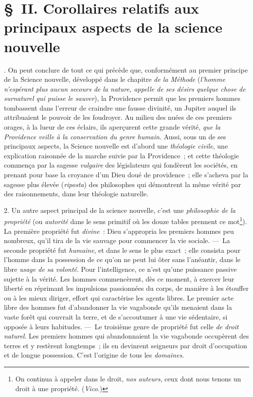 \documentclass[french,twoside]{book} %
\begin{document}
\section[{§ II. Corollaires relatifs aux principaux aspects de la science nouvelle}]{§ II. Corollaires relatifs aux principaux aspects de la science nouvelle}
. On peut conclure de tout ce qui précède que, conformément au premier principe de la Science nouvelle, développé dans le chapitre {\itshape de la Méthode} ({\itshape l’homme n’espérant plus aucun secours de la nature, appelle de ses désirs quelque chose de surnaturel qui puisse le sauver}), la Providence permit que les premiers hommes tombassent dans l’erreur de craindre une fausse divinité, un Jupiter auquel ils attribuaient le pouvoir de les foudroyer. Au milieu des nuées de ces premiers orages, à la lueur de ces éclairs, ils aperçurent cette grande vérité, {\itshape que la Providence veille à la conservation du genre humain}. Aussi, sous un de ses principaux aspects, la Science nouvelle est d’abord une {\itshape théologie civile}, une explication raisonnée de la marche suivie par la Providence ; et cette théologie commença par la sagesse {\itshape vulgaire} des législateurs qui fondèrent les sociétés, en prenant pour base la croyance d’un Dieu doué de providence ; elle s’acheva par la sagesse plus élevée ({\itshape riposta}) des philosophes qui démontrent la même vérité par des raisonnements, dans leur théologie naturelle.\par
2. Un autre aspect principal de la science nouvelle, c’est une {\itshape philosophie de la propriété} (ou {\itshape autorité}  dans le sens primitif où les douze tables prennent ce mot\footnote{On continua à appeler dans le droit, {\itshape nos auteurs}, ceux dont nous tenons un droit à une propriété. ({\itshape Vico.})}). La première propriété fut {\itshape divine} : Dieu s’appropria les premiers hommes peu nombreux, qu’il tira de la vie sauvage pour commencer la vie sociale. — La seconde propriété fut {\itshape humaine}, et dans le sens le plus exact ; elle consista pour l’homme dans la possession de ce qu’on ne peut lui ôter sans l’anéantir, dans le libre {\itshape usage de sa volonté}. Pour l’intelligence, ce n’est qu’une puissance passive sujette à la vérité. Les hommes commencèrent, dès ce moment, à exercer leur liberté en réprimant les impulsions passionnées du corps, de manière à les étouffer ou à les mieux diriger, effort qui caractérise les agents libres. Le premier acte libre des hommes fut d’abandonner la vie vagabonde qu’ils menaient dans la vaste forêt qui couvrait la terre, et de s’accoutumer à une vie sédentaire, si opposée à leurs habitudes. — Le troisième genre de propriété fut celle {\itshape de droit naturel}. Les premiers hommes qui abandonnaient la vie vagabonde occupèrent des terres et y restèrent longtemps ; ils en devinrent seigneurs par droit d’occupation et de longue possession. C’est l’origine de tous les {\itshape domaines}.\par
\end{document}
